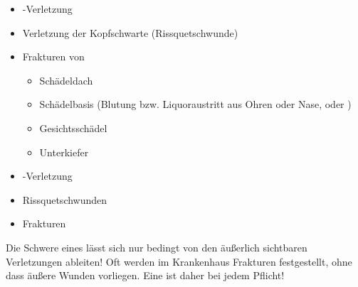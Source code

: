 {%
\begin{itemize}
  \item {}-Verletzung
  \item Verletzung der Kopfschwarte  (Rissquetschwunde)
  \item Frakturen von
  \begin{itemize}
    \item Schädeldach
    \item Schädelbasis (Blutung bzw. Liquoraustritt
    aus Ohren oder Nase, 
    oder )
    \item Gesichtsschädel
    \item Unterkiefer
  \end{itemize}
\end{itemize}
}{
\begin{itemize}
  \item {}-Verletzung
  \item Rissquetschwunden
  \item Frakturen
\end{itemize}
}{}{}{}



\begin{Danger}
  \item Die Schwere eines  lässt sich nur bedingt von
  den äußerlich sichtbaren  Verletzungen ableiten! Oft werden
  im Krankenhaus Frakturen festgestellt,  ohne dass äußere
  Wunden vorliegen. Eine  ist
  daher bei jedem  Pflicht!
\end{Danger}

